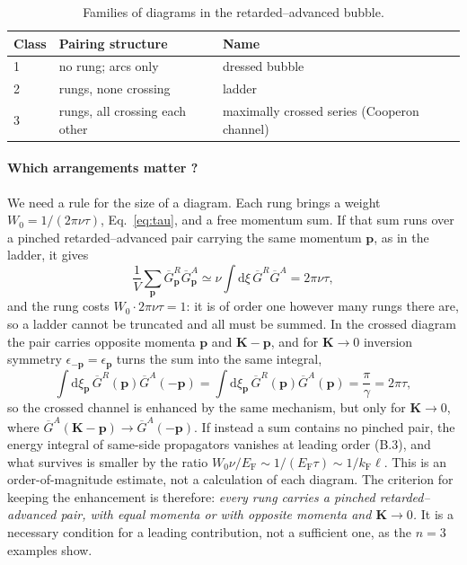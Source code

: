 \begin{table}[ht]
\centering
\renewcommand{\arraystretch}{1.25}
\begin{tabular}{@{}p{1.2cm}p{5.2cm}p{7cm}@{}}
\toprule
Class & Pairing structure & Name\\
\midrule
1 & no rung; arcs only & dressed bubble\\
2 & rungs, none crossing & ladder\\
3 & rungs, all crossing each other & maximally crossed series
(Cooperon channel)\\
\bottomrule
\end{tabular}
\caption{Families of diagrams in the retarded--advanced bubble.}
\label{tab:classes}
\end{table}

\paragraph{Which arrangements matter ?}
We need a rule for the size of a diagram. Each rung brings a
weight $W_0=1/(2\pi\nu\tau)$, Eq.~\eqref{eq:tau}, and a free momentum sum.
If that sum runs over a pinched retarded--advanced pair carrying
the same momentum $\mathbf p$, as in the ladder, it gives
\[
\frac1V\sum_{\mathbf p}
\overline G^R_{\mathbf p}\overline G^A_{\mathbf p}
\simeq
\nu\int\mathrm{d}\xi\,
\overline G^R\overline G^A
=2\pi\nu\tau,
\]
and the rung costs $W_0\cdot2\pi\nu\tau=1$: it is of order one
however many rungs there are, so a ladder cannot be truncated
and all must be summed. In the crossed diagram the pair carries
opposite momenta $\mathbf p$ and $\mathbf K-\mathbf p$, and
for $\mathbf K\to0$ inversion symmetry
$\epsilon_{-\mathbf p}=\epsilon_{\mathbf p}$ turns the sum into
the same integral,
\[
\int\mathrm{d}\xi_{\mathbf p}\,
\overline G^R(\mathbf p)\overline G^A(-\mathbf p)
=
\int\mathrm{d}\xi_{\mathbf p}\,
\overline G^R(\mathbf p)\overline G^A(\mathbf p)
=\frac{\pi}{\gamma}=2\pi\tau,
\]
so the crossed channel is enhanced by the same mechanism, but
only for $\mathbf K\to0$, where
$\overline G^A(\mathbf K-\mathbf p)
\to\overline G^A(-\mathbf p)$. If instead a sum contains no
pinched pair, the energy integral of same-side propagators
vanishes at leading order (B.3), and what survives is smaller
by the ratio
$W_0\nu/E_{\mathrm F}\sim1/(E_{\mathrm F}\tau)
\sim1/k_{\mathrm F}\ell$. This is an order-of-magnitude
estimate, not a calculation of each diagram. The criterion for
keeping the enhancement is therefore: \emph{every rung carries
a pinched retarded--advanced pair, with equal momenta or with
opposite momenta and $\mathbf K\to0$.} It is a necessary
condition for a leading contribution, not a sufficient one,
as the $n=3$ examples show.


